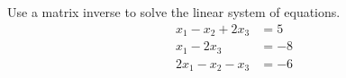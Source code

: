 Use a matrix inverse to solve the linear system of equations.
%
\begin{align*}
x_1-x_2+2x_3&=5\\
x_1-2x_3&=-8\\
2x_1-x_2-x_3&=-6
\end{align*}